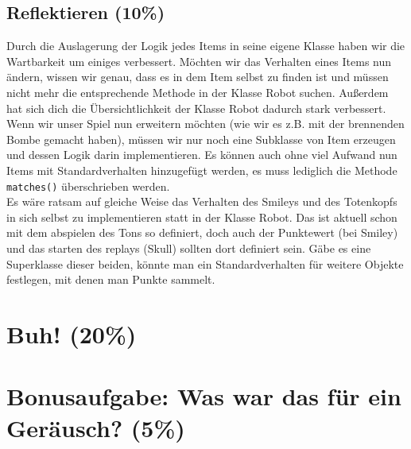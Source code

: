 \documentclass{pi1}
\begin{document}
\subsection{Reflektieren (10\%)}

Durch die Auslagerung der Logik jedes Items in seine eigene Klasse haben wir die Wartbarkeit um einiges verbessert. Möchten wir das Verhalten eines Items nun ändern, wissen wir genau, dass es in dem Item selbst zu finden ist und müssen nicht mehr die entsprechende Methode in der Klasse Robot suchen. Außerdem hat sich dich die Übersichtlichkeit der Klasse Robot dadurch stark verbessert.\\
Wenn wir unser Spiel nun erweitern möchten (wie wir es z.B. mit der brennenden Bombe gemacht haben), müssen wir nur noch eine Subklasse von Item erzeugen und dessen Logik darin implementieren. Es können auch ohne viel Aufwand nun Items mit Standardverhalten hinzugefügt werden, es muss lediglich die Methode \texttt{matches()} überschrieben werden.\\
Es wäre ratsam auf gleiche Weise das Verhalten des Smileys und des Totenkopfs in sich selbst zu implementieren statt in der Klasse Robot. Das ist aktuell schon mit dem abspielen des Tons so definiert, doch auch der Punktewert (bei Smiley) und das starten des replays (Skull) sollten dort definiert sein. Gäbe es eine Superklasse dieser beiden, könnte man ein Standardverhalten für weitere Objekte festlegen, mit denen man Punkte sammelt.

\section{Buh! (20\%)}

\section{Bonusaufgabe: Was war das für ein Geräusch? (5\%)}
\end{document}
